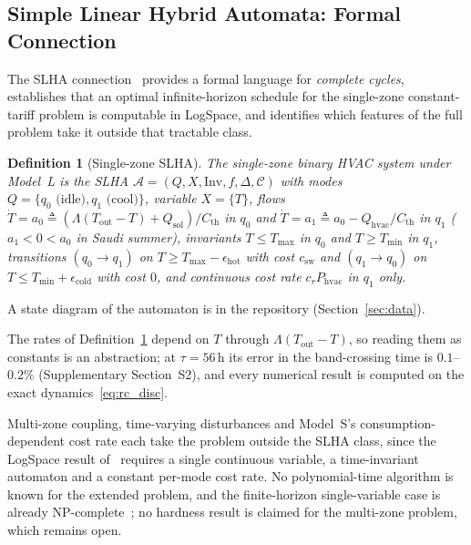 \documentclass[3p,twocolumn,number]{elsarticle}
\newtheorem{definition}{Definition} \newtheorem{proposition}{Proposition} \newtheorem{remark}{Remark} \newtheorem{observation}{Observation} \newtheorem{corollary}{Corollary}
\newcommand{\Tmin}{T_{\min}}
\newcommand{\Tmax}{T_{\max}}
\newcommand{\Tout}{T_{\mathrm{out}}}
\newcommand{\Cth}{C_{\mathrm{th}}}
\newcommand{\Qhvac}{Q_{\mathrm{hvac}}}
\newcommand{\csw}{c_{\mathrm{sw}}}
\newcommand{\Phvac}{P_{\mathrm{hvac}}}
\begin{document}
\subsection{Simple Linear Hybrid Automata: Formal Connection}
\label{subsec:slha}
 
The SLHA connection~\cite{Mousa2016} provides a formal language for \emph{complete cycles}, establishes that an optimal infinite-horizon schedule for the single-zone constant-tariff problem is computable in LogSpace, and identifies which features of the full problem take it outside that tractable class.
 
\begin{definition}[Single-zone SLHA]
\label{def:slha}
The single-zone binary HVAC system under Model~L is the SLHA $\mathcal{A}=(Q,X,\mathrm{Inv},f,\Delta,\mathcal{C})$ with modes $Q=\{q_0\text{ (idle)},q_1\text{ (cool)}\}$, variable $X=\{T\}$, flows $\dot{T}{=}a_0\triangleq(\Lambda(\Tout-T)+Q_{\mathrm{sol}})/\Cth$ in $q_0$ and $\dot{T}{=}a_1\triangleq a_0-\Qhvac/\Cth$ in $q_1$ ($a_1<0<a_0$ in Saudi summer), invariants $T\!\le\!\Tmax$ in $q_0$ and $T\!\ge\!\Tmin$ in $q_1$, transitions $(q_0\!\to\!q_1)$ on $T\!\ge\!\Tmax\!-\!\epsilon_{\mathrm{hot}}$ with cost $\csw$ and $(q_1\!\to\!q_0)$ on $T\!\le\!\Tmin\!+\!\epsilon_{\mathrm{cold}}$ with cost $0$, and continuous cost rate $c_r\Phvac$ in $q_1$ only.
\end{definition}
 
A state diagram of the automaton is in the repository (Section~\ref{sec:data}).

The rates of Definition~\ref{def:slha} depend on $T$ through $\Lambda(\Tout-T)$, so reading them as constants is an abstraction; at $\tau=56\,$h its error in the band-crossing time is $0.1$--$0.2\%$ (Supplementary Section~S2), and every numerical result is computed on the exact dynamics~\eqref{eq:rc_disc}.

Multi-zone coupling, time-varying disturbances and Model~S's consumption-dependent cost rate each take the problem outside the SLHA class, since the LogSpace result of~\cite{Mousa2016} requires a single continuous variable, a time-invariant automaton and a constant per-mode cost rate. No polynomial-time algorithm is known for the extended problem, and the finite-horizon single-variable case is already NP-complete~\cite{Mousa2016}; no hardness result is claimed for the multi-zone problem, which remains open.
 
\end{document}
